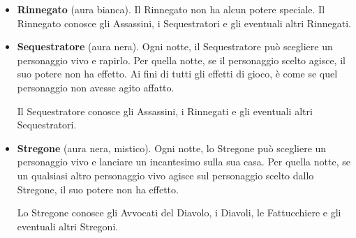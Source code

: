 \documentclass[a4paper,10pt]{article}
\begin{document}
\begin{itemize}
 \item {\bf Rinnegato} (aura bianca). Il Rinnegato non ha alcun potere speciale. Il Rinnegato conosce gli Assassini, i Sequestratori e gli eventuali altri Rinnegati.

 \item {\bf Sequestratore} (aura nera). Ogni notte, il Sequestratore può scegliere un personaggio vivo e rapirlo. Per quella notte, se il personaggio scelto agisce, il suo potere non ha effetto. Ai fini di tutti gli effetti di gioco, è come se quel personaggio non avesse agito affatto.
 
 
 Il Sequestratore conosce gli Assassini, i Rinnegati e gli eventuali altri Sequestratori.

 \item {\bf Stregone} (aura nera, mistico). Ogni notte, lo Stregone può scegliere un personaggio vivo e lanciare un incantesimo sulla sua casa. Per quella notte, se un qualsiasi altro personaggio vivo agisce sul personaggio scelto dallo Stregone, il suo potere non ha effetto.
 
%  
 
 Lo Stregone conosce gli Avvocati del Diavolo, i Diavoli, le Fattucchiere e gli eventuali altri Stregoni.
 
\end{itemize}
\end{document}
